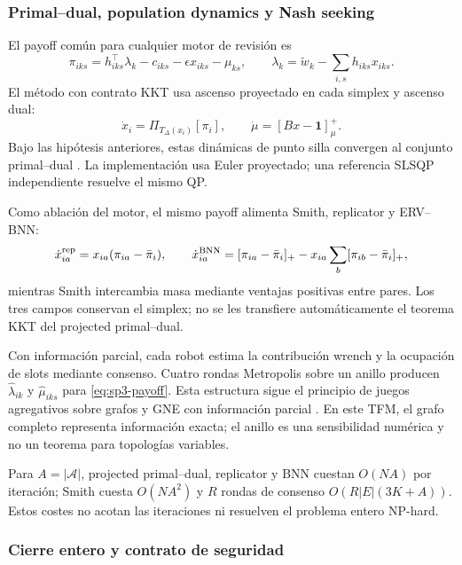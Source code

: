 

\subsubsection{Primal--dual, population dynamics y Nash seeking}

El payoff común para cualquier motor de revisión es
\[
 \pi_{iks}=h_{iks}^{\top}\lambda_k-c_{iks}-\epsilon x_{iks}-\mu_{ks},
 \qquad \lambda_k=\widetilde w_k-\sum_{i,s}h_{iks}x_{iks}.
 \label{eq:sp3-payoff}
\]
El método con contrato KKT usa ascenso proyectado en cada simplex y ascenso dual:
\[
 \dot x_i=\Pi_{T_{\Delta}(x_i)}[\pi_i],
 \qquad
 \dot\mu=[Bx-\mathbf1]^+_{\mu}.
 \label{eq:sp3-pd}
\]
Bajo las hipótesis anteriores, estas dinámicas de punto silla convergen al conjunto
primal--dual \citep{cherukuri2016primaldual}. La implementación usa Euler proyectado;
una referencia SLSQP independiente resuelve el mismo QP.

Como ablación del motor, el mismo payoff alimenta Smith, replicator y ERV--BNN:
\[
 \dot x_{ia}^{\rm rep}=x_{ia}(\pi_{ia}-\bar\pi_i),\qquad
 \dot x_{ia}^{\rm BNN}=[\pi_{ia}-\bar\pi_i]_+
 -x_{ia}\sum_b[\pi_{ib}-\bar\pi_i]_+ ,
\]
mientras Smith intercambia masa mediante ventajas positivas entre pares. Los tres
campos conservan el simplex; no se les transfiere automáticamente el teorema KKT del
projected primal--dual.

Con información parcial, cada robot estima la contribución wrench y la ocupación de
slots mediante consenso. Cuatro rondas Metropolis sobre un anillo producen
$\widehat\lambda_{ik}$ y $\widehat\mu_{iks}$ para \eqref{eq:sp3-payoff}. Esta estructura
sigue el principio de juegos agregativos sobre grafos y GNE con información parcial
\citep{koshal2016aggregative,yi2019operator,franci2022stochasticgne}. En este TFM,
el grafo completo representa información exacta; el anillo es una sensibilidad
numérica y no un teorema para topologías variables.

Para $A=|\mathcal A|$, projected primal--dual, replicator y BNN cuestan
$O(NA)$ por iteración; Smith cuesta $O(NA^2)$ y $R$ rondas de consenso
$O(R|E|(3K+A))$. Estos costes no acotan las iteraciones ni resuelven el problema
entero NP-hard.



\subsubsection{Cierre entero y contrato de seguridad}

